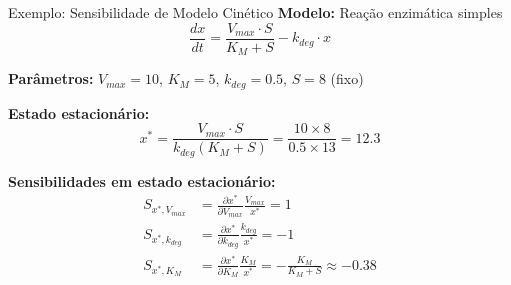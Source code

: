 \begin{frame}[allowframebreaks]{Exemplo: Sensibilidade de Modelo Cinético}
\textbf{Modelo:} Reação enzimática simples
\begin{equation*}
\frac{dx}{dt} = \frac{V_{max} \cdot S}{K_M + S} - k_{deg} \cdot x
\end{equation*}

\textbf{Parâmetros:} $V_{max} = 10$, $K_M = 5$, $k_{deg} = 0.5$, $S = 8$ (fixo)

\vspace{0.3cm}

\textbf{Estado estacionário:}
\begin{equation*}
x^* = \frac{V_{max} \cdot S}{k_{deg}(K_M + S)} = \frac{10 \times 8}{0.5 \times 13} = 12.3
\end{equation*}

\vspace{0.3cm}

\textbf{Sensibilidades em estado estacionário:}
\begin{align*}
S_{x^*, V_{max}} &= \frac{\partial x^*}{\partial V_{max}} \frac{V_{max}}{x^*} = 1\\
S_{x^*, k_{deg}} &= \frac{\partial x^*}{\partial k_{deg}} \frac{k_{deg}}{x^*} = -1\\
S_{x^*, K_M} &= \frac{\partial x^*}{\partial K_M} \frac{K_M}{x^*} = -\frac{K_M}{K_M + S} \approx -0.38
\end{align*}

\end{frame}

